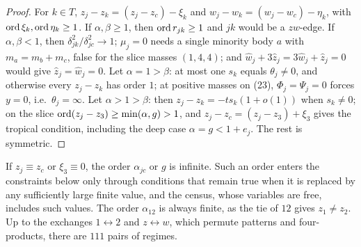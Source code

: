 \begin{proof}
For $k\in T$, $z_j-z_k=(z_j-z_c)-\xi_k$ and $w_j-w_k=(w_j-w_c)-\eta_k$, with
$\operatorname{ord}\xi_k,\operatorname{ord}\eta_k\ge1$.  If $\alpha,\beta\ge1$, then $\operatorname{ord} r_{jk}\ge1$ and $jk$ would be a
$zw$-edge.  If $\alpha,\beta<1$, then $\delta_{jk}^2/\delta_{jc}^2\to1$; $\mu_j=0$ needs a single
minority body $a$ with $m_a=m_b+m_c$, false for the slice masses $(1,4,4)$; and
$\hat w_j+3\hat z_j=3\hat w_j+\hat z_j=0$ would give $\hat z_j=\hat w_j=0$.  Let $\alpha=1>\beta$:
at most one $s_k$ equals $\theta_j\ne0$, and otherwise every $z_j-z_k$ has order $1$; at positive
masses on (23), $\Phi_j=\Psi_j=0$ forces $y=0$, i.e.\ $\theta_j=\infty$.  Let $\alpha>1>\beta$: then
$z_j-z_k=-ts_k(1+o(1))$ when $s_k\ne0$; on the slice $\operatorname{ord}(z_j-z_3)\ge\min(\alpha,g)>1$, and
$z_j-z_c=(z_j-z_3)+\xi_3$ gives the tropical condition, including the deep case
$\alpha=g<1+e_j$.  The rest is symmetric.
\end{proof}

If $z_j\equiv z_c$ or $\xi_3\equiv0$, the order $\alpha_{jc}$ or $g$ is infinite.  Such an order
enters the constraints below only through conditions that remain true when it is replaced by any
sufficiently large finite value, and the census, whose variables are free, includes such values.
The order
$\alpha_{12}$ is always finite, as the tie of $12$ gives $z_1\ne z_2$.  Up to the exchanges
$1\leftrightarrow2$ and $z\leftrightarrow w$, which permute patterns and four-products, there are
$111$ pairs of regimes.

